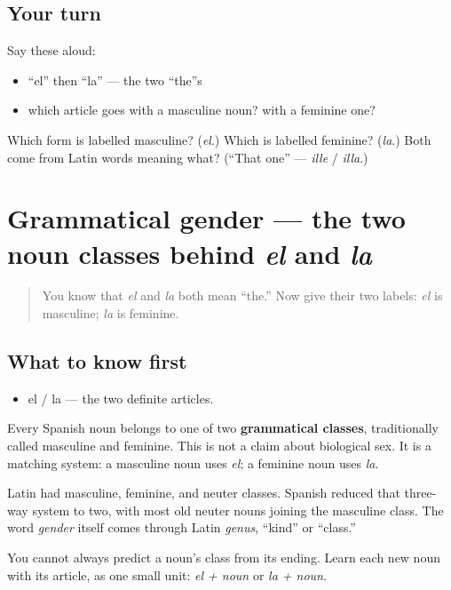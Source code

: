 \subsection*{Your turn}
Say these aloud:

\begin{itemize}
\raggedright
  \item \textquotedblleft{}el\textquotedblright{} then \textquotedblleft{}la\textquotedblright{} — the two \textquotedblleft{}the\textquotedblright{}s
  \item which article goes with a masculine noun? with a feminine one?
\end{itemize}

\begin{tcolorbox}[breakable,colback=teal!4,colframe=teal!35!black,title={Before you move on}]
Which form is labelled masculine? (\emph{el}.) Which is labelled feminine? (\emph{la}.) Both come from Latin words meaning what? (\textquotedblleft{}That one\textquotedblright{} — \emph{ille} / \emph{illa}.)
\end{tcolorbox}
\section[el / la + noun]{Grammatical gender — the two noun classes behind \emph{el} and \emph{la}}

\label{lesson:ES-C01-genero-gramatical}



\begin{quote}
You know that \emph{el} and \emph{la} both mean \textquotedblleft{}the.\textquotedblright{} Now give their two labels: \emph{el} is masculine; \emph{la} is feminine.
\end{quote}

\subsection*{What to know first}
\begin{itemize}
\raggedright
  \item el / la — the two definite articles.
\end{itemize}

\begin{grammarlens}[title={Grammar Lens: grammatical gender}]
Every Spanish noun belongs to one of two \textbf{grammatical classes}, traditionally called masculine and feminine. This is not a claim about biological sex. It is a matching system: a masculine noun uses \emph{el}; a feminine noun uses \emph{la}.

Latin had masculine, feminine, and neuter classes. Spanish reduced that three-way system to two, with most old neuter nouns joining the masculine class. The word \emph{gender} itself comes through Latin \emph{genus}, \textquotedblleft{}kind\textquotedblright{} or \textquotedblleft{}class.\textquotedblright{}

You cannot always predict a noun's class from its ending. Learn each new noun with its article, as one small unit: \emph{el + noun} or \emph{la + noun}.
\end{grammarlens}

